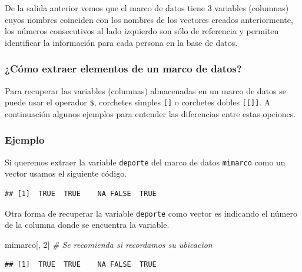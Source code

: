 \documentclass[10pt,]{krantz}
\makeatletter
\newenvironment{Shaded}{\begin{snugshade}}{\end{snugshade}}
\newcommand{\DecValTok}[1]{\textcolor[rgb]{0.00,0.00,0.81}{#1}}
\newcommand{\CommentTok}[1]{\textcolor[rgb]{0.56,0.35,0.01}{\textit{#1}}}
\newcommand{\OperatorTok}[1]{\textcolor[rgb]{0.81,0.36,0.00}{\textbf{#1}}}
\newcommand{\NormalTok}[1]{#1}
\newenvironment{kframe}{%
\medskip{}
\setlength{\fboxsep}{.8em}
 \def\at@end@of@kframe{}%
 \ifinner\ifhmode%
  \def\at@end@of@kframe{\end{minipage}}%
  \begin{minipage}{\columnwidth}%
 \fi\fi%
 \def\FrameCommand##1{\hskip\@totalleftmargin \hskip-\fboxsep
 \colorbox{shadecolor}{##1}\hskip-\fboxsep
     \hskip-\linewidth \hskip-\@totalleftmargin \hskip\columnwidth}%
 \MakeFramed {\advance\hsize-\width
   \@totalleftmargin\z@ \linewidth\hsize
   \@setminipage}}%
 {\par\unskip\endMakeFramed%
 \at@end@of@kframe}
\renewenvironment{Shaded}{\begin{kframe}}{\end{kframe}}
\makeatother
\begin{document}
De la salida anterior vemos que el marco de datos tiene 3 variables
(columnas) cuyos nombres coinciden con los nombres de los vectores
creados anteriormente, los números consecutivos al lado izquierdo son
sólo de referencia y permiten identificar la información para cada
persona en la base de datos.

\subsubsection{¿Cómo extraer elementos de un marco de
datos?}\label{como-extraer-elementos-de-un-marco-de-datos}

Para recuperar las variables (columnas) almacenadas en un marco de datos
se puede usar el operador \texttt{\$}, corchetes simples \texttt{{[}{]}}
o corchetes dobles \texttt{{[}{[}{]}{]}}. A continuación algunos
ejemplos para entender las diferencias entre estas opciones.

\subsubsection*{Ejemplo}\label{ejemplo-3}

Si queremos extraer la variable \texttt{deporte} del marco de datos
\texttt{mimarco} como un vector usamos el siguiente código.

\begin{Shaded}
\end{Shaded}

\begin{verbatim}
## [1]  TRUE  TRUE    NA FALSE  TRUE
\end{verbatim}

Otra forma de recuperar la variable \texttt{deporte} como vector es
indicando el número de la columna donde se encuentra la variable.

\begin{Shaded}
\begin{Highlighting}[]
\NormalTok{mimarco[, }\DecValTok{2}\NormalTok{]  }\CommentTok{# Se recomienda si recordamos su ubicacion}
\end{Highlighting}
\end{Shaded}

\begin{verbatim}
## [1]  TRUE  TRUE    NA FALSE  TRUE
\end{verbatim}
\end{document}
